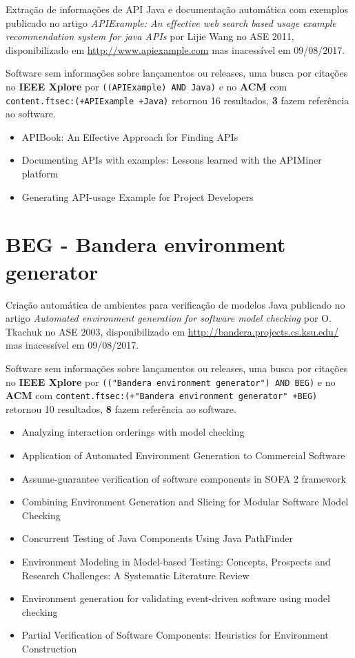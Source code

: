 Extração de informações de API Java e documentação automática com exemplos
publicado no artigo {\it APIExample: An effective web search based usage example recommendation system for java APIs}
por Lijie Wang
no ASE 2011,
disponibilizado em \url{http://www.apiexample.com}
mas inacessível em 09/08/2017.

Software sem informações sobre lançamentos ou releases,
uma busca por citações no {\bf IEEE Xplore} por
\texttt{((APIExample) AND Java)}
e no {\bf ACM} com
\texttt{content.ftsec:(+APIExample +Java)}
retornou
16 resultados,
{\bf 3} fazem referência ao software.

\begin{itemize}
\item APIBook: An Effective Approach for Finding APIs
\item Documenting APIs with examples: Lessons learned with the APIMiner platform
\item Generating API-usage Example for Project Developers
\end{itemize}


\section{BEG - Bandera environment generator}

Criação automática de ambientes para verificação de modelos Java
publicado no artigo {\it Automated environment generation for software model checking}
por O. Tkachuk
no ASE 2003,
disponibilizado em \url{http://bandera.projects.cs.ksu.edu/}
mas inacessível em 09/08/2017.

Software sem informações sobre lançamentos ou releases,
uma busca por citações no {\bf IEEE Xplore} por
\texttt{(("Bandera environment generator") AND BEG)}
e no {\bf ACM} com
\texttt{content.ftsec:(+"Bandera environment generator" +BEG)}
retornou
10 resultados,
{\bf 8} fazem referência ao software.

\begin{itemize}
\item Analyzing interaction orderings with model checking
\item Application of Automated Environment Generation to Commercial Software
\item Assume-guarantee verification of software components in SOFA 2 framework
\item Combining Environment Generation and Slicing for Modular Software Model Checking
\item Concurrent Testing of Java Components Using Java PathFinder
\item Environment Modeling in Model-based Testing: Concepts, Prospects and Research Challenges: A Systematic Literature Review
\item Environment generation for validating event-driven software using model checking
\item Partial Verification of Software Components: Heuristics for Environment Construction
\end{itemize}


